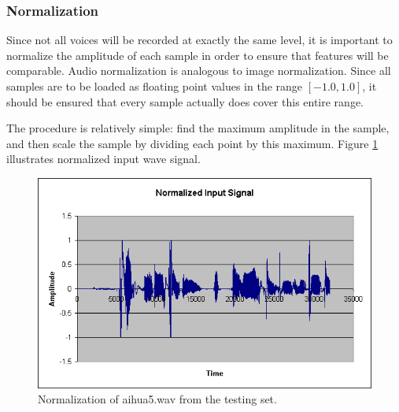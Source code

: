 \subsubsection{Normalization}

Since not all voices will be recorded at exactly the same level, it is important to normalize
the amplitude of each sample in order to ensure that features will be comparable.  Audio
normalization is analogous to image normalization.  Since all samples are to be loaded as
floating point values in the range $[-1.0, 1.0]$, it should be ensured that every sample actually
does cover this entire range.

The procedure is relatively simple: find the maximum amplitude in the sample, and then scale
the sample by dividing each point by this maximum. Figure \ref{fig:prep-norm} illustrates
normalized input wave signal.

\begin{figure}
	\centering
	\includegraphics[width=400pt]{../graphics/graphs/wav-normalized.png}
	\caption{Normalization of aihua5.wav from the testing set.}
	\label{fig:prep-norm}
\end{figure}
